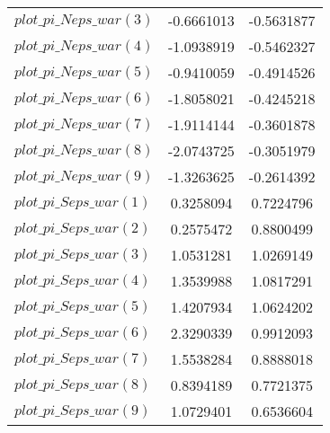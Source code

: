 \begin{center}
\begin{longtable}{lcc}
$plot\_pi\_N eps\_war (3)   $	 & 	     -0.6661013	 & 	     -0.5631877 \\ 
$plot\_pi\_N eps\_war (4)   $	 & 	     -1.0938919	 & 	     -0.5462327 \\ 
$plot\_pi\_N eps\_war (5)   $	 & 	     -0.9410059	 & 	     -0.4914526 \\ 
$plot\_pi\_N eps\_war (6)   $	 & 	     -1.8058021	 & 	     -0.4245218 \\ 
$plot\_pi\_N eps\_war (7)   $	 & 	     -1.9114144	 & 	     -0.3601878 \\ 
$plot\_pi\_N eps\_war (8)   $	 & 	     -2.0743725	 & 	     -0.3051979 \\ 
$plot\_pi\_N eps\_war (9)   $	 & 	     -1.3263625	 & 	     -0.2614392 \\ 
$plot\_pi\_S eps\_war (1)   $	 & 	      0.3258094	 & 	      0.7224796 \\ 
$plot\_pi\_S eps\_war (2)   $	 & 	      0.2575472	 & 	      0.8800499 \\ 
$plot\_pi\_S eps\_war (3)   $	 & 	      1.0531281	 & 	      1.0269149 \\ 
$plot\_pi\_S eps\_war (4)   $	 & 	      1.3539988	 & 	      1.0817291 \\ 
$plot\_pi\_S eps\_war (5)   $	 & 	      1.4207934	 & 	      1.0624202 \\ 
$plot\_pi\_S eps\_war (6)   $	 & 	      2.3290339	 & 	      0.9912093 \\ 
$plot\_pi\_S eps\_war (7)   $	 & 	      1.5538284	 & 	      0.8888018 \\ 
$plot\_pi\_S eps\_war (8)   $	 & 	      0.8394189	 & 	      0.7721375 \\ 
$plot\_pi\_S eps\_war (9)   $	 & 	      1.0729401	 & 	      0.6536604 \\ 
\end{longtable}
 \end{center}
